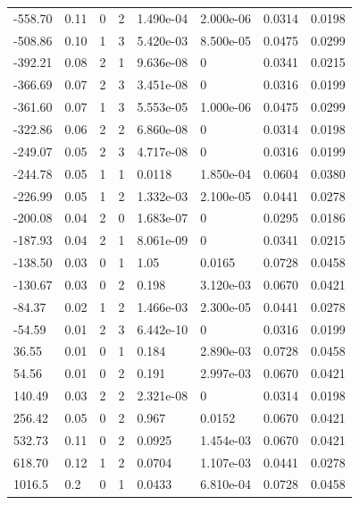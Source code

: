 \documentclass[preview]{standalone}
\begin{document}
{{\begin{tabular}{L{1.2cm}C{1.2cm} C{0.3cm}C{0.5cm} C{1.4cm}C{1.4cm} C{1.4cm}C{1.4cm}}
  -558.70  &  0.11  & 0     &  2 &  1.490e-04  & 2.000e-06  & 0.0314 &  0.0198   \\ 
  -508.86  &  0.10  & 1     &  3 &  5.420e-03  & 8.500e-05  & 0.0475 &  0.0299   \\ 
  -392.21  &  0.08  & 2     &  1 &  9.636e-08  & 0  & 0.0341 &  0.0215   \\ 
  -366.69  &  0.07  & 2     &  3 &  3.451e-08  & 0  & 0.0316 &  0.0199   \\ 
  -361.60  &  0.07  & 1     &  3 &  5.553e-05  & 1.000e-06  & 0.0475 &  0.0299   \\ 
  -322.86  &  0.06  & 2     &  2 &  6.860e-08  & 0  & 0.0314 &  0.0198   \\ 
  -249.07  &  0.05  & 2     &  3 &  4.717e-08  & 0  & 0.0316 &  0.0199   \\ 
  -244.78  &  0.05  & 1     &  1 &  0.0118  & 1.850e-04  & 0.0604 &  0.0380   \\ 
  -226.99  &  0.05  & 1     &  2 &  1.332e-03  & 2.100e-05  & 0.0441 &  0.0278   \\ 
  -200.08  &  0.04  & 2     &  0 &  1.683e-07  & 0  & 0.0295 &  0.0186   \\ 
  -187.93  &  0.04  & 2     &  1 &  8.061e-09  & 0  & 0.0341 &  0.0215   \\ 
  -138.50  &  0.03  & 0     &  1 &  1.05  & 0.0165  & 0.0728 &  0.0458   \\ 
  -130.67  &  0.03  & 0     &  2 &  0.198  & 3.120e-03  & 0.0670 &  0.0421   \\ 
  -84.37  &  0.02  & 1     &  2 &  1.466e-03  & 2.300e-05  & 0.0441 &  0.0278   \\ 
  -54.59  &  0.01  & 2     &  3 &  6.442e-10  & 0  & 0.0316 &  0.0199   \\ 
  36.55  &  0.01  & 0     &  1 &  0.184  & 2.890e-03  & 0.0728 &  0.0458   \\ 
  54.56  &  0.01  & 0     &  2 &  0.191  & 2.997e-03  & 0.0670 &  0.0421   \\ 
  140.49  &  0.03  & 2     &  2 &  2.321e-08  & 0  & 0.0314 &  0.0198   \\ 
  256.42  &  0.05  & 0     &  2 &  0.967  & 0.0152  & 0.0670 &  0.0421   \\ 
  532.73  &  0.11  & 0     &  2 &  0.0925  & 1.454e-03  & 0.0670 &  0.0421   \\ 
  618.70  &  0.12  & 1     &  2 &  0.0704  & 1.107e-03  & 0.0441 &  0.0278   \\ 
  1016.5  &   0.2  & 0     &  1 &  0.0433  & 6.810e-04  & 0.0728 &  0.0458   \\ 

\end{tabular}}}
\end{document}
